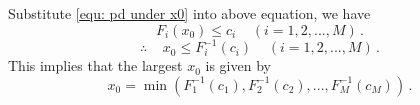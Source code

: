   Substitute \eqref{equ: pd under x0} into above equation, we have
  \begin{equation}
	F_i(x_0) \leq c_i \;\;\;\;(i=1, 2, ..., M)\,.
  \end{equation}
  \begin{equation}
	\label{1125a1}
	\therefore\;\;\;\; x_0 \leq F^{-1}_{i}(c_i) \;\;\;\;(i=1, 2, ..., M)\,.
  \end{equation}
This implies that the largest $x_0$ is given by 
  \begin{equation}
	\label{1127a2}
	x_0 = \min(F_1^{-1}(c_1), F_2^{-1}(c_2), ..., F_M^{-1}(c_M))\,.
  \end{equation}
  \typeout{}
  

  \typeout{}
  
